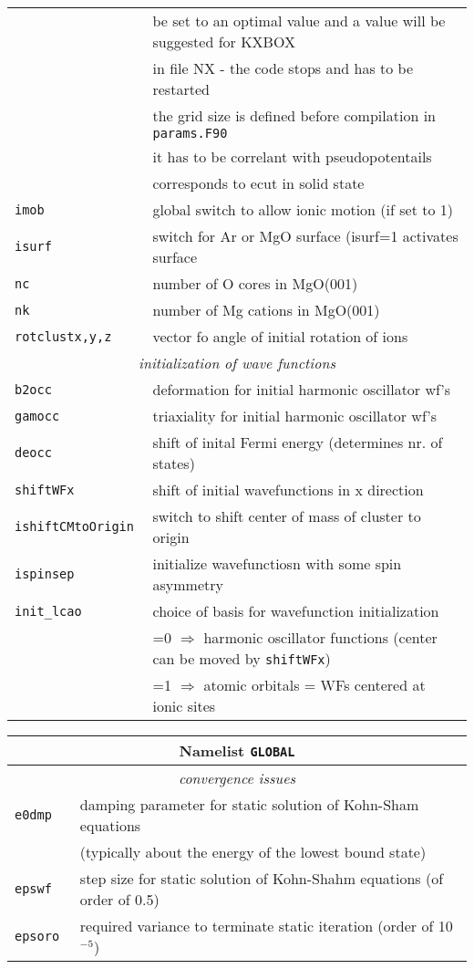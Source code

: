 \documentclass[12pt]{article}
\begin{document}
\begin{tabular}{ll}
&be set to an optimal value and a value will be suggested for KXBOX \\
&in file NX - the code stops and has to be restarted\\
&the grid size is defined before compilation in {\tt params.F90}\\
&it has to be correlant with pseudopotentails\\
&corresponds to ecut in solid state\\
{\tt imob          }& global switch to allow ionic motion (if set to 1) \\
{\tt isurf            }& switch for Ar or MgO surface (isurf=1 activates
          surface\\
{\tt nc               }& number of O cores in MgO(001)\\
{\tt nk               }& number of Mg cations in MgO(001)\\
{\tt rotclustx,y,z } & vector fo angle of initial rotation of ions\\
\hline
\multicolumn{2}{c}{\it initialization of wave functions} \\
\hline
{\tt b2occ            }& deformation for initial harmonic oscillator wf's\\
{\tt gamocc           }& triaxiality for initial harmonic oscillator wf's\\
{\tt deocc            }& shift of inital Fermi energy (determines nr. of
states)\\
{\tt shiftWFx         }& shift of initial wavefunctions in x direction \\
{\tt ishiftCMtoOrigin }& switch to shift center of mass of cluster to origin\\
{\tt ispinsep         }& initialize wavefunctiosn with some spin asymmetry\\
{\tt init\_lcao       }& choice of basis for wavefunction initialization \\
& =0 $\Longrightarrow$ harmonic oscillator functions (center can be
moved
  by {\tt shiftWFx})
\\
& =1 $\Longrightarrow$ atomic orbitals = WFs centered at ionic sites
\\
\hline
\end{tabular}

\newpage

\begin{tabular}{ll}
\hline
\multicolumn{2}{c}{Namelist {\tt GLOBAL}} in {\tt for005.<name>} \\
\hline
\multicolumn{2}{c}{\it convergence issues} \\
\hline
{\tt e0dmp            }& damping parameter for static solution of Kohn-Sham equations\\
& (typically about the energy of the lowest bound state)\\
{\tt epswf            }& step size for static solution of Kohn-Shahm
equations (of order of 0.5)\\
{\tt epsoro           }& required variance to terminate static iteration (order of 10$^{-5}$)\\
\hline
\end{tabular}
\end{document}
